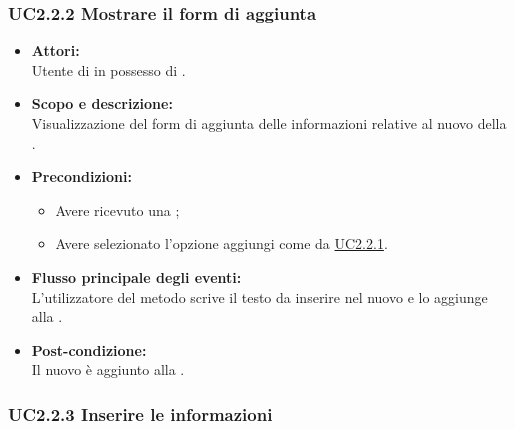 \subsubsection{UC2.2.2 Mostrare il form di aggiunta} \label{UC2.2.2}

\begin{itemize}
	\item \textbf{Attori:}
	\\Utente di  in possesso di \ProjectName{}.
	\item \textbf{Scopo e descrizione:} 
	\\Visualizzazione del form di aggiunta delle informazioni relative al nuovo  della .
	\item \textbf{Precondizioni:}
	\begin{itemize}
		\item Avere ricevuto una  ;
		\item Avere selezionato l'opzione aggiungi  come da \hyperref[UC2.2.1]{UC2.2.1}.
	\end{itemize}
	\item \textbf{Flusso principale degli eventi:}
	\\L'utilizzatore del metodo scrive il testo da inserire nel nuovo  e lo aggiunge alla .
	\item \textbf{Post-condizione:}
	\\Il nuovo  è aggiunto alla  .
\end{itemize}

\subsubsection{UC2.2.3  Inserire le informazioni} \label{UC2.2.3}

